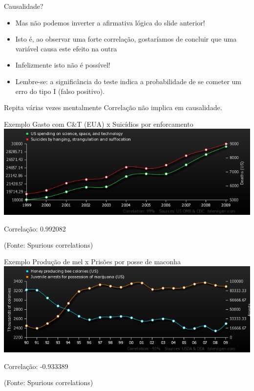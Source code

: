 \documentclass{beamer}
\begin{document}
\begin{frame}{Causalidade?}
  \begin{itemize}
  \item Mas não podemos inverter a afirmativa lógica do slide
    anterior!
  \item Isto é, ao observar uma forte correlação, gostaríamos de
    concluir que uma variável \alert{causa} este efeito na outra
  \item Infelizmente isto não é possível!
  \item Lembre-se: a significância do teste indica a probabilidade de
    se cometer um erro do tipo I (falso positivo).
  \end{itemize}
  \begin{block}{Repita várias vezes mentalmente}
    Correlação não implica em causalidade.
  \end{block}
\end{frame}


\begin{frame}{Exemplo}
  Gasto com C\&T (EUA) x Suicídios por enforcamento
  \includegraphics[width=\textwidth]{Assoc/us-spending-on-science-space-and-technology_suicides-by-hanging-strangulation-and-suffocation}

  Correlação: 0.992082

  (Fonte: Spurious correlations)
\end{frame}

\begin{frame}{Exemplo}
  Produção de mel x Prisões por posse de maconha
  \includegraphics[width=\textwidth]{Assoc/honey-producing-bee-colonies-us_juvenile-arrests-for-possession-of-marijuana-us}

  Correlação: -0.933389

  (Fonte: Spurious correlations)
\end{frame}
\end{document}
